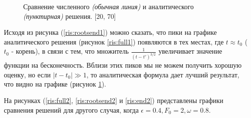\documentclass[14pt, a4paper]{article}
\numberwithin{figure}{section}
\numberwithin{equation}{section}
\begin{document}
\begin{figure}[h]
	\caption{Сравнение численного \textit{(обычная линия)} и аналитического \textit{(пунктирная)} решения. [20, 70]}
	\label{ris:end1}
\end{figure}

Исходя из рисунка (\ref{ris:rootsend1}) можно сказать, что пики на графике аналитического решения (рисунок \ref{ris:full1}) появляются в тех местах, где $t\approx t_0$ ($t_0$ - корень), в связи с тем, что множитель $\frac{1}{(t-t')^{3/2}}$ увеличивает значение функции на бесконечность.
Вблизи этих пиков мы не можем получить хорошую оценку, но если $|t-t_0|\gg 1$,  то аналитическая формула дает лучший результат, что видно на графике (рисунок \ref{ris:end1}).

На рисунках (\ref{ris:full2}, \ref{ris:rootsend2} и \ref{ris:end2}) представлены графики сравнения решений для другого случая, когда $\epsilon = 0.4, F_0 = 2, \omega = 0.8$.
\end{document}
